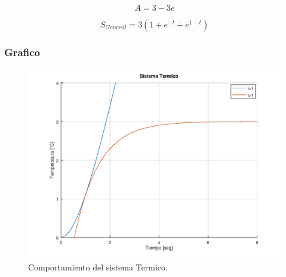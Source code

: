 \documentclass[a4paper,12pt]{article}
\begin{document}
\begin{equation}
A=3-3e
\end{equation}

\begin{equation}
S_{General}=3(1 + e^{-t} + e^{1-t})
\end{equation}

\subsubsection{Grafico}
\vspace*{0.3in}

\begin{figure}[H]
\begin{center}
\includegraphics[width = 400pt]{imagenes/termotanqueTermico.png}
\caption{\small Comportamiento del sistema Termico.}
\label{red}
\end{center}
\end{figure}






\end{document}
